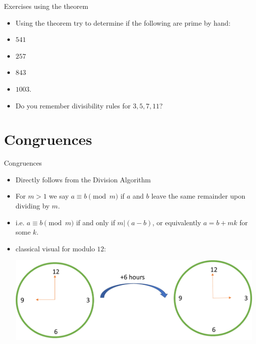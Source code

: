 \documentclass[ %
 usenames,dvipsnames,
aspectratio=169,11pt ]{beamer}
\newenvironment{stepitemize}{\begin{itemize}[<+->]}{\end{itemize} }
\begin{document}
\begin{frame}{Exercises using the theorem}
\begin{stepitemize}
\item Using the theorem try to determine if the following are prime by hand:
\item $541$
\item $257$
\item $843$
\item $1003$.
\item Do you remember divisibility rules for $3,5,7,11$?
\end{stepitemize}

\end{frame}

\section{Congruences}
\begin{frame}{Congruences}
\begin{stepitemize}
\item Directly follows from the Division Algorithm
\item For $m>1$ we say $a\equiv b \pmod{m}$ if $a$ and $b$ leave the same remainder upon dividing by $m$.
\item i.e. $a\equiv b \pmod{m}$ if and only if $m|(a-b)$, or equivalently $a=b+mk$ for some $k$.
\item classical visual for modulo $12$:
    \begin{center}
    \includegraphics[scale=.35]{images/clock.pdf}
\end{center}

\end{stepitemize}
\end{frame}
\end{document}
